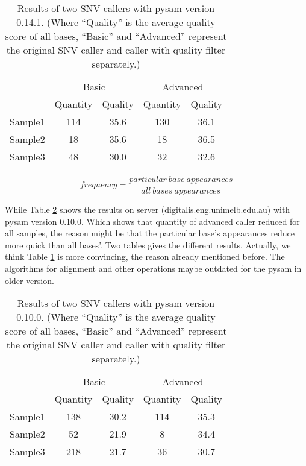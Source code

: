 \documentclass[a4paper]{article}
\begin{document}
\begin{table}[H]
	\centering
	\begin{tabular}{c|cc|cc}
		\hline
		 & \multicolumn{2}{c|}{Basic}  &  \multicolumn{2}{c}{Advanced}   \\
		 &	Quantity & Quality & Quantity & Quality \\	 
		\hline
		Sample1 & 114  & 35.6 & 130 & 36.1 \\
		\hline
		Sample2 & 18 & 35.6 & 18 & 36.5  \\
		\hline
		Sample3 & 48 & 30.0 & 32 & 32.6  \\
		\hline
	\end{tabular}
	\caption{\label{tab:1}Results of two SNV callers with pysam version 0.14.1. (Where ``Quality'' is the average quality score of all bases, ``Basic'' and ``Advanced'' represent the original SNV caller and caller with quality filter separately.)}
\end{table}

\begin{equation}
frequency = \frac{particular\ base\ appearances}{all\ bases\ appearances}
\label{fun1}
\end{equation}

While Table \ref{tab:2} shows the results on server (digitalis.eng.unimelb.edu.au) with pysam version 0.10.0. Which shows that quantity of advanced caller reduced for all samples, the reason might be that the particular base's appearances reduce more quick than all bases'. Two tables gives the different results. Actually, we think Table \ref{tab:1} is more convincing, the reason already mentioned before. The algorithms for alignment and other operations maybe outdated for the pysam in older version.

\begin{table}[H]
	\centering
	\begin{tabular}{c|cc|cc}
		\hline
		& \multicolumn{2}{c|}{Basic}  &  \multicolumn{2}{c}{Advanced}   \\
		&	Quantity & Quality & Quantity & Quality \\	 
		\hline
		Sample1 & 138  & 30.2 & 114 & 35.3 \\
		\hline
		Sample2 & 52 & 21.9 & 8 & 34.4  \\
		\hline
		Sample3 & 218 & 21.7 & 36 & 30.7  \\
		\hline
	\end{tabular}
	\caption{\label{tab:2}Results of two SNV callers with pysam version 0.10.0. (Where ``Quality'' is the average quality score of all bases, ``Basic'' and ``Advanced'' represent the original SNV caller and caller with quality filter separately.)}
\end{table}
\end{document}
